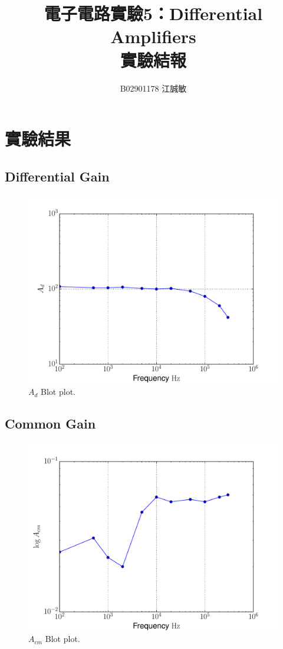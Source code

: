 \documentclass[12pt, a4paper]{article}
\title{ \bf {\Huge 電子電路實驗5：Differential Amplifiers }\\ 實驗結報}
\author{B02901178 江誠敏}
\begin{document}
\maketitle


\section{實驗結果}

\subsection{Differential Gain}
\begin{figure}[H]
\begin{center}
  \includegraphics[width=.7\textwidth]{fig_ad.pdf}
\end{center}
\caption{$A_{d}$ Blot plot.}
\label{fig:}
\end{figure}
\subsection{Common Gain}
\begin{figure}[H]
\begin{center}
  \includegraphics[width=.7\textwidth]{fig_acm.pdf}
\end{center}
\caption{$A_{cm}$ Blot plot.}
\label{fig:}
\end{figure}
\end{document}
